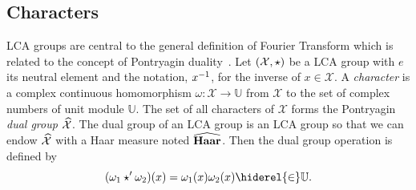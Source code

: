 \subsection{Characters}
\label{subsec:character} \acf{LCA} groups are central to the general definition
of Fourier Transform which is related to the concept of Pontryagin
duality~\citep{folland1994course}.  Let $(\mathcal{X}, \star)$ be a \ac{LCA}
group with $e$ its neutral element and the notation, ${x}^{-1}$, for the inverse
of $x \in \mathcal{X}$. A \emph{character} is a complex continuous homomorphism
$\omega:\mathcal{X}\to\mathbb{U}$ from $\mathcal{X}$ to the set of complex
numbers of unit module $\mathbb{U}$. The set of all characters of $\mathcal{X}$
forms the Pontryagin \emph{dual  group} $\widehat{\mathcal{X}}$. The dual group of
an \ac{LCA} group is an \ac{LCA} group so that we can endow
$\widehat{\mathcal{X}}$ with a  Haar measure noted $\widehat{\mathbf{Haar}}$. Then
the dual group operation is defined by
\begin{dmath*}
    (\omega_1 \groupop' \omega_2)(x)=\omega_1(x)\omega_2(x) \hiderel{\in}
    \mathbb{U}.
\end{dmath*}
